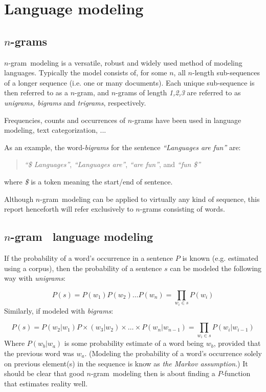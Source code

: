\documentclass[a4paper,11pt]{kth-mag}
\newcommand{\todo}{ ... }
\newcommand{\ngram}{$n$-gram}
\begin{document}
\section{Language modeling}

\subsection{\ngram s}
\ngram~modeling is a versatile, robust and widely used method of modeling languages. Typically the model consists of, for some $n$, all $n$-length sub-sequences of a longer sequence (i.e. one or many documents). Each unique sub-sequence is then referred to as a \ngram, and \ngram s of length \emph{1,2,3} are referred to as \emph{unigrams, bigrams} and \emph{trigrams}, respectively\cite{ngrams}.

Frequencies, counts and occurrences of \ngram s have been used in language modeling\cite{chen_goodman}, text categorization\cite{ngrams}, \todo

As an example, the word-\emph{bigrams} for the sentence \emph{``Languages are fun''} are:
\begin{quote}
  \vspace*{0.1cm}
  \centering
\emph{``\$ Languages''}, \emph{``Languages are''}, \emph{``are fun''}, and \emph{``fun \$''}
\end{quote}
where \emph{\$} is a token meaning the start/end of sentence.

Although \ngram~modeling can be applied to virtually any kind of sequence, this report henceforth will refer exclusively to \ngram s consisting of words.

\newpage
\subsection{\ngram~ language modeling}
If the probability of a word's occurrence in a sentence $P$ is known (e.g. estimated using a corpus), then the probability of a sentence $s$ can be modeled the following way with \emph{unigrams}:

\begin{equation} \label{eq:unigram_chain_prob}
P(s) = P(w_1) P(w_2) \dots P(w_n) =\prod_{w_i \in s}P(w_i)
\end{equation}
Similarly, if modeled with \emph{bigrams}:

\begin{equation} \label{eq:bigram_chain_prob}
P(s) = P(w_2 | w_1)P\times (w_3 | w_2) \times \dots \times P(w_n | w_{n-1}) = \prod_{w_i \in s}P(w_i|w_{i-1})
\end{equation}
Where $P(w_b | w_a)$ is some probability estimate of a word being $w_b$, provided that the previous word was $w_a$. (Modeling the probability of a word's occurrence solely on previous element(s) in the sequence is know as \emph{the Markov assumption}.) It should be clear that good \ngram~modeling then is about finding a $P$-function that estimates reality well.
\end{document}
